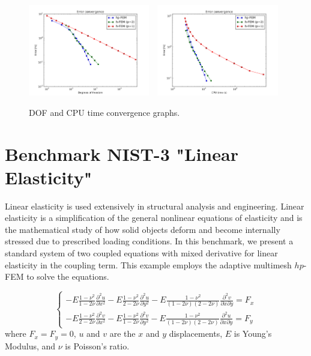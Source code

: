 \documentclass[12pt]{elsarticle}
\begin{document}
\begin{figure}[!ht]
\centering
\includegraphics[height=4cm]{nist/nist-2/conv_dof_aniso.png}\ \
\includegraphics[height=4cm]{nist/nist-2/conv_cpu_aniso.png}
\caption{DOF and CPU time convergence graphs.}
\label{fig:nist-2-conv}
\end{figure}




\section{Benchmark NIST-3 "Linear Elasticity"}
\label{sec:bench-3}

Linear elasticity is used extensively in structural analysis
and engineering. Linear elasticity is a simplification
of the general nonlinear equations of elasticity and is the mathematical
study of how solid objects deform and become internally
stressed due to prescribed loading conditions.
In this benchmark, we present a standard system of two
coupled equations with mixed derivative for linear elasticity
in the coupling term. This example employs the adaptive multimesh $hp$-FEM
to solve the equations.

\begin{equation}\label{crack}
\left\{
\begin{array}{l}
\displaystyle
-E \frac{1-\nu^2}{1-2\nu} \frac{\partial^{2} u}{\partial x^{2}} - E\frac{1-\nu^2}{2-2 \nu} \frac{\partial^{2} u}{\partial y^{2}}
-E \frac{1-\nu^2}{(1-2\nu)(2-2\nu)} \frac{\partial^{2} v}{\partial x \partial y} = F_{x} \\
\displaystyle
-E \frac{1-\nu^2}{2-2\nu} \frac{\partial^{2} v}{\partial x^{2}} - E\frac{1-\nu^2}{1-2\nu} \frac{\partial^{2} v}{\partial y^{2}}
-E \frac{1-\nu^2}{(1-2\nu)(2-2\nu)} \frac{\partial^{2} u}{\partial x \partial y} = F_{y}
\end{array}
\right.
\end{equation}
where $F_{x} = F_{y} = 0$, $u$ and $v$ are the
$x$ and $y$ displacements, $E$ is Young's Modulus,
and $\nu$ is Poisson's ratio.
\end{document}
